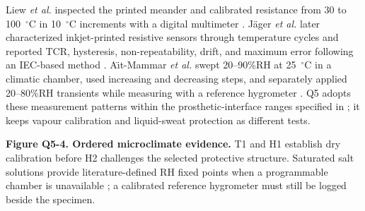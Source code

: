 \clearpage
\hypertarget{q5-microclimate}{}


{\fontsize{8.75}{10.3}\selectfont
Liew \textit{et al.} inspected the printed meander and calibrated resistance
from 30 to 100~$^{\circ}$C in 10~$^{\circ}$C increments with a digital
multimeter \cite{liew2020}. J\"ager \textit{et al.} later characterized
inkjet-printed resistive sensors through temperature cycles and reported TCR,
hysteresis, non-repeatability, drift, and maximum error following an
IEC-based method \cite{jager2022}. A\"{\i}t-Mammar \textit{et al.} swept
20--90\%RH at 25~$^{\circ}$C in a climatic chamber, used increasing and
decreasing steps, and separately applied 20--80\%RH transients while measuring
with a reference hygrometer \cite{aitmammar2020}. Q5 adopts these measurement
patterns within the prosthetic-interface ranges specified in
; it keeps vapour calibration and
liquid-sweat protection as different tests.\par}

\begin{center}
\end{center}
{\fontsize{7.45}{8.6}\selectfont\color{AUBGray}
\textbf{Figure Q5-4. Ordered microclimate evidence.} T1 and H1 establish dry
calibration before H2 challenges the selected protective structure. Saturated
salt solutions provide literature-defined RH fixed points when a programmable
chamber is unavailable \cite{greenspan1977}; a calibrated reference hygrometer
must still be logged beside the specimen.\par}


